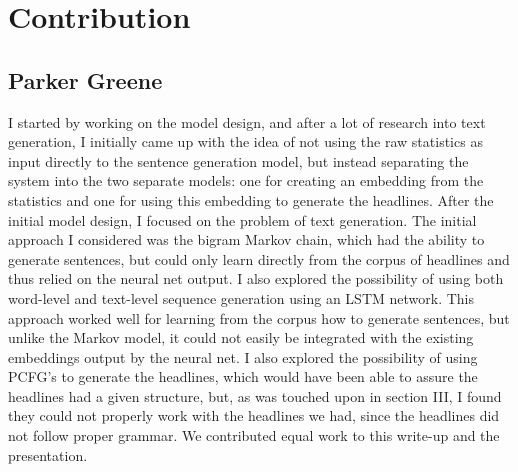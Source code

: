 \documentclass[12pt, journal]{IEEEtran}
\begin{document}
\section{Contribution}

\subsection{Parker Greene}

I started by working on the model design, and after a lot of research into text generation, I initially came up with the idea of not using the raw statistics as input directly to the sentence generation model, but instead separating the system into the two separate models: one for creating an embedding from the statistics and one for using this embedding to generate the headlines. After the initial model design, I focused on the problem of text generation. The initial approach I considered was the bigram Markov chain, which had the ability to generate sentences, but could only learn directly from the corpus of headlines and thus relied on the neural net output. I also explored the possibility of using both word-level and text-level sequence generation using an LSTM network. This approach worked well for learning from the corpus how to generate sentences, but unlike the Markov model, it could not easily be integrated with the existing embeddings output by the neural net. I also explored the possibility of using PCFG's to generate the headlines, which would have been able to assure the headlines had a given structure, but, as was touched upon in section III, I found they could not properly work with the headlines we had, since the headlines did not follow proper grammar. We contributed equal work to this write-up and the presentation.
\end{document}
